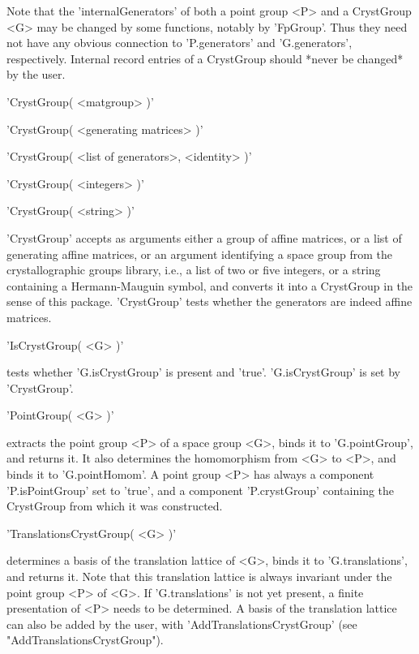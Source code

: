 Note that  the  'internalGenerators'  of both   a point  group <P> and  a
CrystGroup  <G> may be changed by  some  functions, notably by 'FpGroup'.
Thus they need  not have  any obvious  connection  to  'P.generators' and
'G.generators',  respectively.  Internal record  entries of  a CrystGroup
should *never be changed* by the user.


'CrystGroup( <matgroup> )'

'CrystGroup( <generating matrices> )'

'CrystGroup( <list of generators>, <identity> )'

'CrystGroup( <integers> )'

'CrystGroup( <string> )'

'CrystGroup' accepts as arguments either a group of affine matrices, or a
list of generating affine  matrices, or an  argument identifying  a space
group from the crystallographic  groups library, i.e., a  list of  two or
five  integers,  or a string    containing a Hermann-Mauguin  symbol, and
converts it into a CrystGroup in the sense of this package.  'CrystGroup'
tests whether the generators are indeed affine matrices.


'IsCrystGroup( <G> )'

tests whether 'G.isCrystGroup' is present and 'true'. 'G.isCrystGroup' is
set by 'CrystGroup'.


'PointGroup( <G> )'

extracts  the  point  group  <P>  of a    space group  <G>,   binds it to
'G.pointGroup', and returns it.  It also determines the homomorphism from
<G> to <P>, and binds it to 'G.pointHomom'. A  point group <P> has always
a   component  'P.isPointGroup'    set  to   'true',    and  a  component
'P.crystGroup' containing the CrystGroup from which it was constructed.


'TranslationsCrystGroup( <G> )'

determines a  basis  of  the translation lattice   of <G>,  binds   it to
'G.translations', and returns it.  Note  that this translation lattice is
always invariant under the  point group <P>  of <G>.  If 'G.translations'
is not yet present, a finite presentation  of <P> needs to be determined.
A basis  of the translation lattice  can also be  added by the user, with
'AddTranslationsCrystGroup' (see "AddTranslationsCrystGroup").

